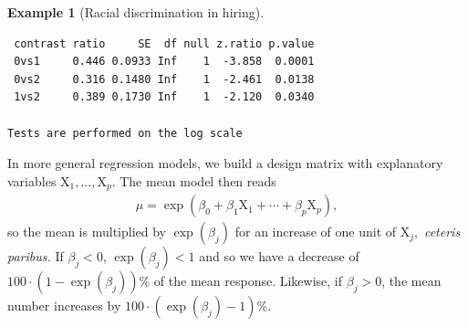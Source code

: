 \documentclass[
  11pt,
  letterpaper,
]{scrbook}
\theoremstyle{definition}
\theoremstyle{definition}
\newtheorem{example}{Example}[chapter]
\theoremstyle{remark}
\begin{document}
\begin{example}[Racial discrimination in
hiring]
\begin{verbatim}
 contrast ratio     SE  df null z.ratio p.value
 0vs1     0.446 0.0933 Inf    1  -3.858  0.0001
 0vs2     0.316 0.1480 Inf    1  -2.461  0.0138
 1vs2     0.389 0.1730 Inf    1  -2.120  0.0340

Tests are performed on the log scale 
\end{verbatim}

\end{example}

In more general regression models, we build a design matrix with
explanatory variables \(\mathrm{X}_1, \ldots, \mathrm{X}_p\). The mean
model then reads \begin{align*}
\mu = \exp(\beta_0 + \beta_1 \mathrm{X}_{1} + \cdots + \beta_p \mathrm{X}_{p}),
\end{align*} so the mean is multiplied by \(\exp(\beta_j)\) for an
increase of one unit of \(\mathrm{X}_{j},\) \emph{ceteris paribus.} If
\(\beta_j < 0\), \(\exp(\beta_j) < 1\) and so we have a decrease of
\(100\cdot(1-\exp(\beta_j))\)\% of the mean response. Likewise, if
\(\beta_j>0\), the mean number increases by
\(100\cdot(\exp(\beta_j)-1)\)\%.
\end{document}
